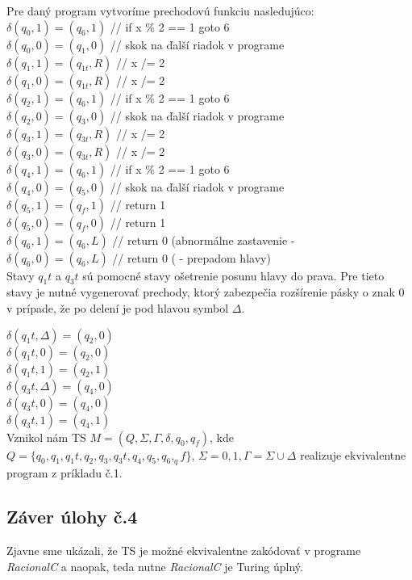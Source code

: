 \documentclass[10pt]{article}
\begin{document}
Pre daný program vytvoríme prechodovú funkciu nasledujúco: \\
    $\delta(q_0, 1) = (q_6, 1)$ // if x \% 2 == 1 goto 6  \\
    $\delta(q_0, 0) = (q_1, 0)$ // skok na ďalší riadok v programe\\
    $\delta(q_1, 1) = (q_{1t}, R)$ //  x /= 2 \\
    $\delta(q_1, 0) = (q_{1t}, R)$ //  x /= 2\\
    $\delta(q_2, 1) = (q_6, 1)$ // if x \% 2 == 1 goto 6\\
    $\delta(q_2, 0) = (q_3, 0)$ // skok na ďalší riadok v programe\\
    $\delta(q_3, 1) = (q_{3t}, R)$ //  x /= 2 \\
    $\delta(q_3, 0) = (q_{3t}, R)$ //  x /= 2\\
    $\delta(q_4, 1) = (q_6, 1)$ // if x \% 2 == 1 goto 6\\
    $\delta(q_4, 0) = (q_5, 0)$ // skok na ďalší riadok v programe\\
    $\delta(q_5, 1) = (q_f, 1)$ // return 1\\
    $\delta(q_5, 0) = (q_f, 0)$ // return 1\\
    $\delta(q_6, 1) = (q_6, L)$ // return 0 (abnormálne zastavenie -\\
    $\delta(q_6, 0) = (q_6, L)$ // return 0 ( - prepadom hlavy)\\

Stavy $q_1t$ a $q_3t$ sú pomocné stavy ošetrenie posunu hlavy do prava. Pre tieto stavy je nutné vygenerovať 
prechody, ktorý zabezpečia rozšírenie pásky o znak 0 v prípade, že po delení je pod hlavou symbol $\Delta$. 

    $\delta(q_1t, \Delta) = (q_2, 0)$ \\
    $\delta(q_1t, 0) = (q_2, 0)$ \\
    $\delta(q_1t, 1) = (q_2, 1)$ \\

    $\delta(q_3t, \Delta) = (q_4, 0)$ \\
    $\delta(q_3t, 0) = (q_4, 0)$ \\
    $\delta(q_3t, 1) = (q_4, 1)$ \\

Vznikol nám TS $M = (Q, \Sigma, \Gamma, \delta, q_0, q_f)$, kde $Q = \{q_0, q_1,q_1t,q_2,q_3,q_3t,q_4,q_5,q_6,_qf\}$, $\Sigma = {0,1}, \Gamma = \Sigma \cup {\Delta}$ realizuje 
ekvivalentne program z príkladu č.1.
\subsection*{Záver úlohy č.4}
Zjavne sme ukázali, že TS je možné ekvivalentne zakódovať v programe \textit{RacionalC} a naopak,
teda nutne \textit{RacionalC} je Turing úplný.
\end{document}
